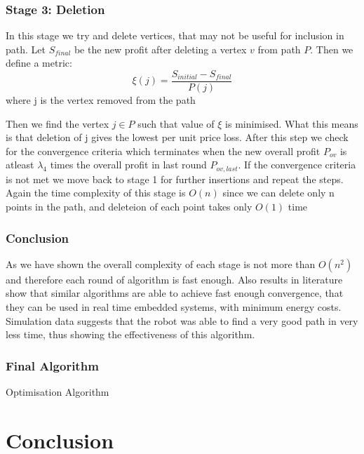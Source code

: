 \documentclass{article}
\begin{document}
\subsubsection{Stage 3: Deletion}

In this stage we try and delete vertices, that may not be useful for inclusion in path.
Let $S_{final}$ be the new profit after deleting a vertex $v$ from path $P$. Then we define a metric: 
\begin{equation}  \label{eq5}
    \xi (j)= \frac{S_{initial} - S_{final}}{P(j)}   
\end{equation}
where j is the vertex removed from the path

Then we find the vertex $j \in P$ such that value of $\xi$ is minimised. What this means is that deletion of j gives the lowest per unit price loss.
After this step we check for the convergence criteria which terminates when the new overall profit $P_{ov}$ is atleast $\lambda_4$ times the overall profit in last round $P_{ov,last}$.
If the convergence criteria is not met we move back to stage 1 for further insertions and repeat the steps. 
Again the time complexity of this stage is $O(n)$ since we can delete only n points in the path, and deleteion of each point takes only $O(1)$ time

\subsubsection{Conclusion}

As we have shown the overall complexity of each stage is not more than $O(n^2)$ and therefore each round of algorithm is fast enough.
Also results in literature show that similar algorithms are able to achieve fast enough convergence, that they can be used in real time embedded systems, with minimum energy costs. \cite{c2}
Simulation data suggests that the robot was able to find a very good path in very less time, thus showing the effectiveness of this algorithm.

\subsubsection{Final Algorithm}

\begin{algorithm}[H]
    \SetAlgoLined
\caption{Optimisation Algorithm}
\end{algorithm}



\section{Conclusion}




\end{document}
